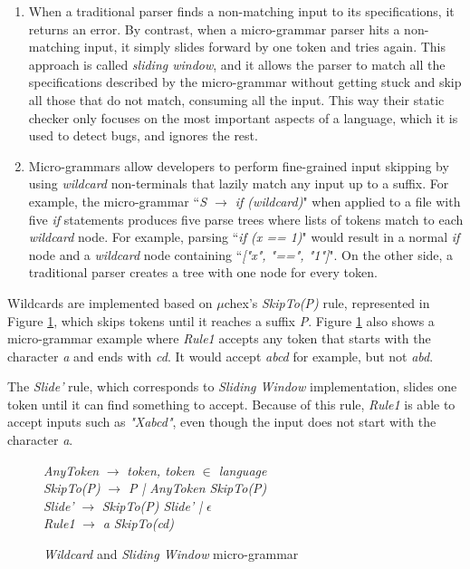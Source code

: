 \begin{enumerate}
  \item When a traditional parser finds a non-matching input to its specifications, it returns an error. By contrast, when a micro-grammar parser hits a non-matching input, it simply slides forward by one token and tries again. This approach is called \textit{sliding window}, and it allows the parser to match all the specifications described by the micro-grammar without getting stuck and skip all those that do not match, consuming all the input. 
This way their static checker only focuses on the most important aspects of a language, which it is used to detect bugs, and ignores the rest. 


\item  Micro-grammars allow developers to perform fine-grained input skipping by using \textit{wildcard} non-terminals that lazily match any input up to a suffix. For example, the micro-grammar ``\textit{S  \( \rightarrow \) if (wildcard)}" when applied to a file with five \textit{if} statements produces five parse trees where lists of tokens match to each \textit{wildcard} node. For example, parsing ``\textit{if (x == 1)}" would result in a normal \textit{if} node and a \textit{wildcard} node containing ``\textit{["x", "==", "1"]}". On the other side, a traditional parser creates a tree with one node for every token.
\end{enumerate}


Wildcards are implemented based on \( \mu\)chex's \textit{SkipTo(P)} rule, represented in Figure \ref{skipTo}, which skips tokens until it reaches a suffix \textit{P}. Figure \ref{skipTo} also shows a micro-grammar example where \textit{Rule1} accepts any token that starts with the character \textit{a} and ends with \textit{cd}. It would accept \textit{abcd} for example, but not \textit{abd}. 

The \textit{Slide'} rule, which corresponds to \textit{Sliding Window} implementation, slides one token until it can find something to accept. Because of this rule, \textit{Rule1} is able to accept inputs such as \textit{"Xabcd"}, even though the input does not start with the character \textit{a}.
 
\begin{figure}
\centering
\begin{minipage}{.5\linewidth}
\textit{AnyToken} \( \rightarrow \) \textit{token, token \(\in\) language}\\
\textit{SkipTo(P)}  \( \rightarrow \) \textit{P | AnyToken SkipTo(P)} \\
\textit{Slide'} \( \rightarrow \) \textit{SkipTo(P) Slide' |  \(\epsilon\)} \\
\textit{Rule1} \( \rightarrow \) \textit{a SkipTo(cd)}
\end{minipage}    

\caption{\textit{Wildcard} and \textit{Sliding Window} micro-grammar}
    \label{skipTo}
\end{figure} 


